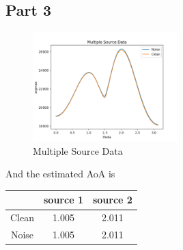 \documentclass{article}
\begin{document}
        \subsection{Part 3}
        \begin{figure}[H]
            \centering
            \includegraphics[width = 0.5\textwidth]{pic/Figure_5.png}
            \caption{Multiple Source Data}
        \end{figure}

        And the estimated AoA is 


        \begin{table}[H]
            \centering
            \begin{tabular}{@{}ccc@{}}
            \toprule
                & source 1 & source 2 \\ \midrule
            Clean & 1.005    & 2.011    \\
            Noise & 1.005    & 2.011    \\ \bottomrule
            \end{tabular}
        \end{table}
\end{document}
